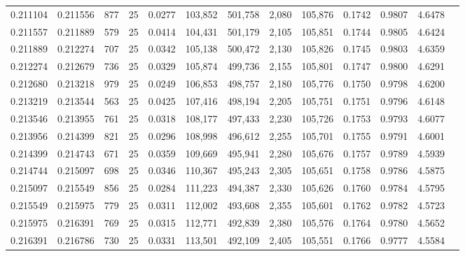 \begin{tabular}{rrrrrrrrrrrrr}
0.211104 & 0.211556 &   877 &  25 &                                     0.0277 & 103,852 & 501,758 &   2,080 & 105,876 & 0.1742 & 0.9807 & 4.6478 \\
0.211557 & 0.211889 &   579 &  25 &                                     0.0414 & 104,431 & 501,179 &   2,105 & 105,851 & 0.1744 & 0.9805 & 4.6424 \\
0.211889 & 0.212274 &   707 &  25 &                                     0.0342 & 105,138 & 500,472 &   2,130 & 105,826 & 0.1745 & 0.9803 & 4.6359 \\
0.212274 & 0.212679 &   736 &  25 &                                     0.0329 & 105,874 & 499,736 &   2,155 & 105,801 & 0.1747 & 0.9800 & 4.6291 \\
0.212680 & 0.213218 &   979 &  25 &                                     0.0249 & 106,853 & 498,757 &   2,180 & 105,776 & 0.1750 & 0.9798 & 4.6200 \\
0.213219 & 0.213544 &   563 &  25 &                                     0.0425 & 107,416 & 498,194 &   2,205 & 105,751 & 0.1751 & 0.9796 & 4.6148 \\
0.213546 & 0.213955 &   761 &  25 &                                     0.0318 & 108,177 & 497,433 &   2,230 & 105,726 & 0.1753 & 0.9793 & 4.6077 \\
0.213956 & 0.214399 &   821 &  25 &                                     0.0296 & 108,998 & 496,612 &   2,255 & 105,701 & 0.1755 & 0.9791 & 4.6001 \\
0.214399 & 0.214743 &   671 &  25 &                                     0.0359 & 109,669 & 495,941 &   2,280 & 105,676 & 0.1757 & 0.9789 & 4.5939 \\
0.214744 & 0.215097 &   698 &  25 &                                     0.0346 & 110,367 & 495,243 &   2,305 & 105,651 & 0.1758 & 0.9786 & 4.5875 \\
0.215097 & 0.215549 &   856 &  25 &                                     0.0284 & 111,223 & 494,387 &   2,330 & 105,626 & 0.1760 & 0.9784 & 4.5795 \\
0.215549 & 0.215975 &   779 &  25 &                                     0.0311 & 112,002 & 493,608 &   2,355 & 105,601 & 0.1762 & 0.9782 & 4.5723 \\
0.215975 & 0.216391 &   769 &  25 &                                     0.0315 & 112,771 & 492,839 &   2,380 & 105,576 & 0.1764 & 0.9780 & 4.5652 \\
0.216391 & 0.216786 &   730 &  25 &                                     0.0331 & 113,501 & 492,109 &   2,405 & 105,551 & 0.1766 & 0.9777 & 4.5584 \\

\end{tabular}
